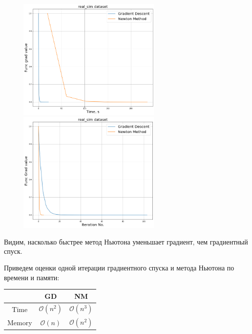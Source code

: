 \documentclass[14pt]{article}
\begin{document}
 \begin{figure}[h]
	\centering
	\includegraphics[height=6cm]{real_grad.png}
	\includegraphics[height=6cm]{real_grad_no.png}
\end{figure}

Видим, насколько быстрее метод Ньютона уменьшает градиент, чем градиентный спуск.

\newpage

Приведем оценки одной итерации градиентного спуска и метода Ньютона по времени и памяти:

\begin{center}
\begin{tabular}{ | c || c c |}
	\hline 
		& GD & NM \\ [0.5ex]
	\hline \hline
	Time & $\mathcal{O}(n^2)$ & $\mathcal{O}(n^3)$\\
	Memory & $\mathcal{O}(n)$ & $\mathcal{O}(n^2)$ \\ \hline
\end{tabular}
\end{center}
\end{document}

